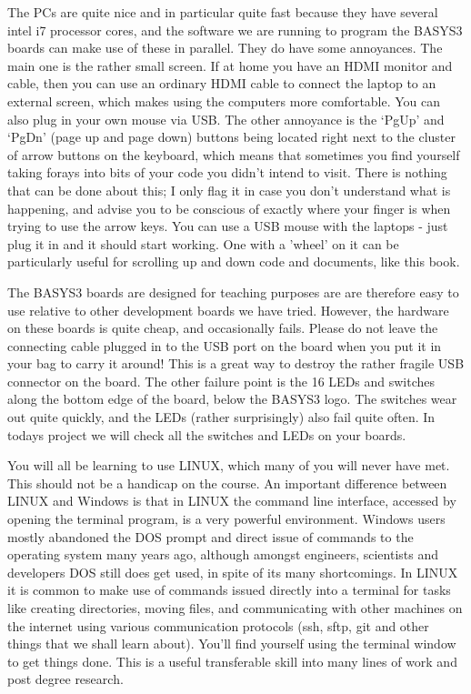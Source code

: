 \documentclass[../physical_computing.tex]{subfiles}
\begin{document}
The PCs are quite nice and in particular quite fast because they have several intel i7 processor cores, and the software we are running to program the BASYS3 boards can make use of these in parallel. They do have some annoyances. The main one is the rather small screen. If at home you have an HDMI monitor and cable, then you can use an ordinary HDMI cable to connect the laptop to an external screen, which makes using the computers more comfortable. You can also plug in your own mouse via USB. The other annoyance is the ‘PgUp’ and ‘PgDn’ (page up and page down) buttons being located right next to the cluster of arrow buttons on the keyboard, which means that sometimes you find yourself taking forays into bits of your code you didn’t intend to visit. There is nothing that can be done about this; I only flag it in case you don’t understand what is happening, and advise you to be conscious of exactly where your finger is when trying to use the arrow keys. You can use a USB mouse with the laptops - just plug it in and it should start working. One with a 'wheel' on it can be particularly useful for scrolling up and down code and documents, like this book.

The BASYS3 boards are designed for teaching purposes are are therefore easy to use relative to other development boards we have tried. However, the hardware on these boards is quite cheap, and occasionally fails. Please do not leave the connecting cable plugged in to the USB port on the board when you put it in your bag to carry it around! This is a great way to destroy the rather fragile USB connector on the board. The other failure point is the 16 LEDs and switches along the bottom edge of the board, below the BASYS3 logo. The switches wear out quite quickly, and the LEDs (rather surprisingly) also fail quite often. In todays project we will check all the switches and LEDs on your boards.

You will all be learning to use LINUX, which many of you will never have met. This should not be a handicap on the course. An important difference between LINUX and Windows is that in LINUX the command line interface, accessed by opening the terminal program, is a very powerful environment. Windows users mostly abandoned the DOS prompt and direct issue of commands to the operating system many years ago, although amongst engineers, scientists and developers DOS still does get used, in spite of its many shortcomings. In LINUX it is common to make use of commands issued directly into a terminal for tasks like creating directories, moving files, and communicating with other machines on the internet using various communication protocols (ssh, sftp, git and other things that we shall learn about). You’ll find yourself using the terminal window to get things done. This is a useful transferable skill into many lines of work and post degree research.
\end{document}
